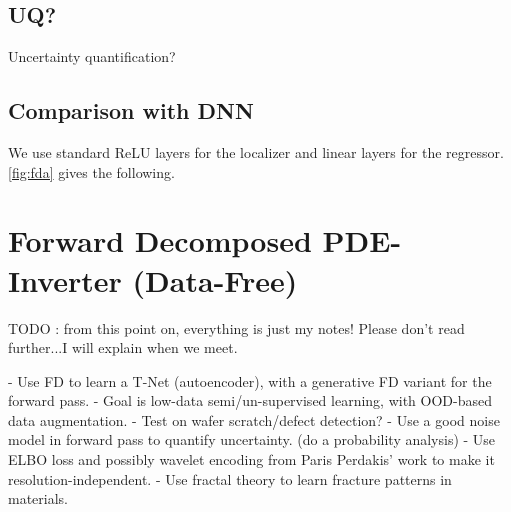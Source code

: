 \documentclass[12pt]{iopart}
\theoremstyle{break}
\begin{document}
\subsection{UQ?}
Uncertainty quantification?
	
\subsection{Comparison with DNN}
We use standard ReLU layers for the localizer and linear layers for the regressor. \ref{fig:fda} gives the following.

\begin{figure}[htpb]
\centering


\end{figure}

	
\section{Forward Decomposed PDE-Inverter (Data-Free)}
	
TODO : from this point on, everything is just my notes! 
Please don't read further...I will explain when we meet.
	
- Use FD to learn a T-Net (autoencoder), with a generative FD variant for the forward pass.
- Goal is low-data semi/un-supervised learning, with OOD-based data augmentation.
- Test on wafer scratch/defect detection?
- Use a good noise model in forward pass to quantify uncertainty. (do a probability analysis)
- Use ELBO loss and possibly wavelet encoding from Paris Perdakis' work to make it resolution-independent.
- Use fractal theory to learn fracture patterns in materials.
	
\end{document}
